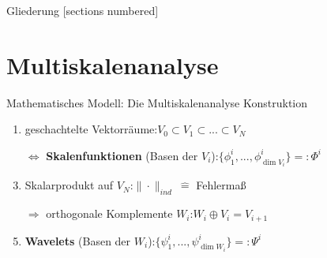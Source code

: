 \begin{frame}{Gliederung}
	[sections numbered]
	\tableofcontents[hideallsubsections]
\end{frame}

\section[Multiskalenanalyse \hspace{42mm}\small am Beispiel der eindimensionalen Haar-Wavelets]{Multiskalenanalyse}
	
	\begin{frame}{Mathematisches Modell: Die Multiskalenanalyse}
		\alert{Konstruktion}
		\begin{enumerate}
			\item geschachtelte Vektorräume:\hspace{16.5mm}$V_0\subset V_1\subset ...\subset V_N$\vspace{2mm}
			\item[$\Leftrightarrow$\hspace{-0.3mm}] {\bf Skalenfunktionen} (Basen der $V_i$):\hspace{8mm}$\{\phi^i_1, ..., \phi^i_{\dim V_i}\}=:\Phi^i$\vspace{2mm}\pause
			\item Skalarprodukt auf $V_N$:\hspace{27.2mm}$\|\cdot\|_{ind}\ \widehat{=}$ Fehlermaß\vspace{2mm}
			\item[$\Rightarrow$\hspace{-0.3mm}] orthogonale Komplemente $W_i$:\hspace{12mm}$W_i\oplus V_i=V_{i+1}$\vspace{2mm}\pause
			\item {\bf Wavelets} (Basen der $W_i$):\hspace{21.5mm}$\{\psi^i_1, ..., \psi^i_{\dim W_i}\}=:\Psi^i$
		\end{enumerate}
	\end{frame}

